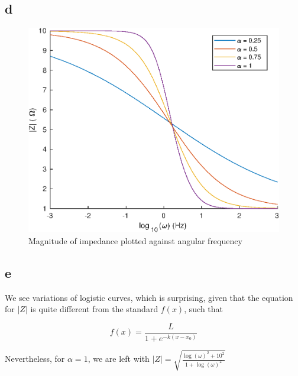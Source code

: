 \subsection{d}
\begin{figure}[h]
    \centering
    \includegraphics[scale=0.9, center]{./eps/topic4_d.eps}
    \caption{Magnitude of impedance plotted against angular frequency}
    \label{fig:Topic4-d}
\end{figure}
\pagebreak


\subsection{e}
We see variations of logistic curves, which is surprising, given that the equation for $|Z|$ is quite different from the standard $f(x)$, such that

\begin{equation}
	f(x) = \frac{L}{1+e^{-k(x-x_0)}}
\end{equation}

Nevertheless, for $\alpha = 1$, we are left with $|Z| = \sqrt{\frac{{\log(\omega)}^2 + 10^2}{1+{\log(\omega)}^2}}$